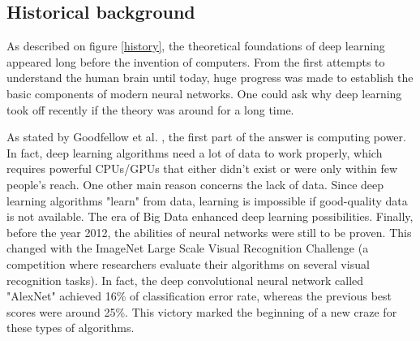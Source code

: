 \subsection{Historical background}
\label{historical_background}

\setlength{\marginparwidth}{3cm}\leavevmode {}As described on figure \ref{history}, the theoretical foundations of deep learning appeared long before the invention of computers. From the first attempts to understand the human brain until today, huge progress was made to establish the basic components of modern neural networks. One could ask why deep learning took off recently if the theory was around for a long time.

As stated by Goodfellow et al. \cite{15}, the first part of the answer is computing power. In fact, deep learning algorithms need a lot of data to work properly, which requires powerful CPUs/GPUs that either didn't exist or were only within few people's reach. One other main reason concerns the lack of data. Since deep learning algorithms "learn" from data, learning is impossible if good-quality data is not available. The era of Big Data enhanced deep learning possibilities. 
Finally, before the year 2012, the abilities of neural networks were still to be proven. This changed with the ImageNet Large Scale Visual Recognition Challenge (a competition where researchers evaluate their algorithms on several visual recognition tasks). In fact, the deep convolutional neural network called "AlexNet" achieved 16\% of classification error rate, whereas the previous best scores were around 25\%. This victory marked the beginning of a new craze for these types of algorithms.


